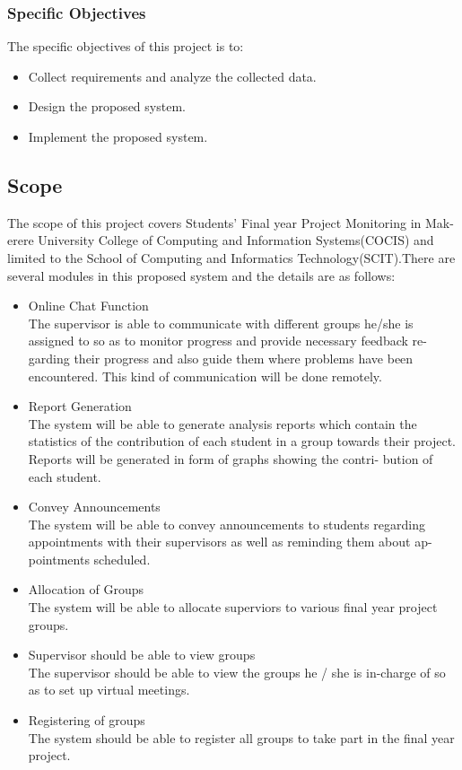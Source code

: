 \documentclass{article}
\begin{document}
\subsubsection{Specific Objectives}
The specific objectives of this project is to:
\begin{itemize}
\item Collect requirements and analyze the collected data.
\item Design the proposed system.
\item Implement the proposed system.
\end{itemize}
\subsection{Scope}
The scope of this project covers Students' Final year Project Monitoring in Mak-
erere University College of Computing and Information Systems(COCIS) and
limited to the School of Computing and Informatics Technology(SCIT).There
are several modules in this proposed system and the details are as follows:
\begin{itemize}
\item Online Chat Function\\
The supervisor is able to communicate with different groups he/she is
assigned to so as to monitor progress and provide necessary feedback re-
garding their progress and also guide them where problems have been
encountered. This kind of communication will be done remotely.
\item Report Generation\\
The system will be able to generate analysis reports which contain the
statistics of the contribution of each student in a group towards their
project. Reports will be generated in form of graphs showing the contri-
bution of each student.
\item Convey Announcements\\
The system will be able to convey announcements to students regarding
appointments with their supervisors as well as reminding them about ap-
pointments scheduled.
\item Allocation of Groups\\
The system will be able to allocate superviors to various final year project
groups.
\item Supervisor should be able to view groups\\
The supervisor should be able to view the groups he / she is in-charge of
so as to set up virtual meetings.
\item Registering of groups\\
The system should be able to register all groups to take part in the final
year project.
\end{itemize}
\end{document}
